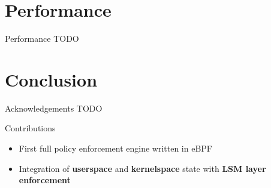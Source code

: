 \documentclass[12pt, dvipsnames]{beamer}
\begin{document}
\section{Performance}

\begin{frame}[t]{Performance}
TODO
\end{frame}

\section{Conclusion}

\begin{frame}[t]{Acknowledgements}
TODO
\end{frame}

\begin{frame}[t]{Contributions}
\begin{itemize}
    \item First full policy enforcement engine written in eBPF
    \item Integration of \textbf{userspace} and \textbf{kernelspace} state with \textbf{LSM layer enforcement}
\end{itemize}
\end{frame}
\end{document}
